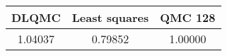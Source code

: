 \begin{tabular}{|c|c|c|}
\hline
DLQMC&Least squares&QMC 128\\ 
\hline

1.04037 & 0.79852 & 1.00000\\ 
\hline
\end{tabular}

